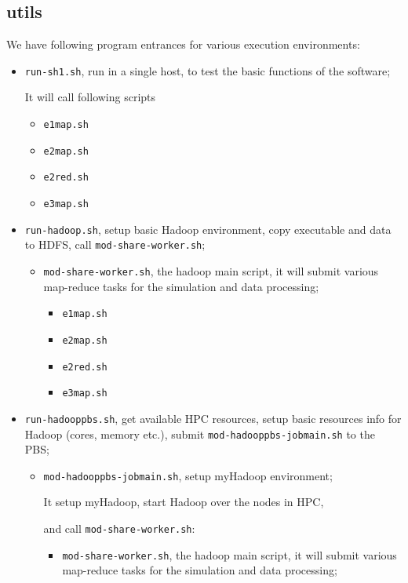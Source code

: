 \subsection{utils}

We have following program entrances for various execution environments:

\begin{itemize}
  \item \texttt{run-sh1.sh}, run in a single host, to test the basic functions of the software;


    It will call following scripts
    \begin{itemize}
      \item \texttt{e1map.sh}
      \item \texttt{e2map.sh}
      \item \texttt{e2red.sh}
      \item \texttt{e3map.sh}
    \end{itemize}
  \item \texttt{run-hadoop.sh}, setup basic Hadoop environment, copy executable and data to HDFS, call \texttt{mod-share-worker.sh};
    \begin{itemize}
      \item \texttt{mod-share-worker.sh}, the hadoop main script, it will submit various map-reduce tasks for the simulation and data processing;
        \begin{itemize}
          \item \texttt{e1map.sh}
          \item \texttt{e2map.sh}
          \item \texttt{e2red.sh}
          \item \texttt{e3map.sh}
        \end{itemize}
    \end{itemize}

  \item \texttt{run-hadooppbs.sh}, get available HPC resources, setup basic resources info for Hadoop (cores, memory etc.), submit \texttt{mod-hadooppbs-jobmain.sh} to the PBS;

    \begin{itemize}
      \item \texttt{mod-hadooppbs-jobmain.sh}, setup myHadoop environment;

        It setup myHadoop, start Hadoop over the nodes in HPC,

        and call \texttt{mod-share-worker.sh}:
        \begin{itemize}
          \item \texttt{mod-share-worker.sh}, the hadoop main script, it will submit various map-reduce tasks for the simulation and data processing;


\end{itemize}
\end{itemize}
\end{itemize}
